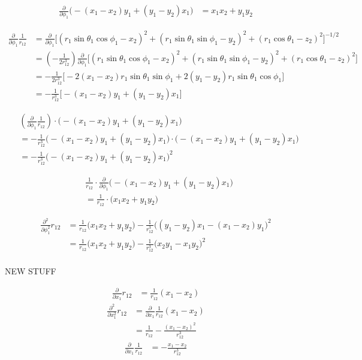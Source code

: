 \begin{align*}
    \frac{\partial}{\partial \phi_1} \Big( -(x_1-x_2)y_1 + (y_1-y_2)x_1 \Big)
    &= x_1x_2 + y_1y_2
\end{align*}

\begin{align*}
    \frac{\partial}{\partial \phi_1} \frac{1}{r_{12}}
    &= \frac{\partial}{\partial \phi_1} \Big[ (r_1\sin\theta_1\cos\phi_1 - x_2)^2 + (r_1\sin\theta_1\sin\phi_1 - y_2)^2 + (r_1\cos\theta_1 - z_2)^2 \Big]^{-1/2} \\
    &= \left(-\frac{1}{2r_{12}^3}\right) \frac{\partial}{\partial \phi_1} \Big[ (r_1\sin\theta_1\cos\phi_1 - x_2)^2 + (r_1\sin\theta_1\sin\phi_1 - y_2)^2 + (r_1\cos\theta_1 - z_2)^2 \Big] \\
    &= -\frac{1}{2r_{12}^3} \Big[ -2(x_1-x_2)r_1\sin\theta_1\sin\phi_1 + 2(y_1-y_2)r_1\sin\theta_1\cos\phi_1 \Big] \\
    &= -\frac{1}{r_{12}^3} \Big[ -(x_1-x_2)y_1 + (y_1-y_2)x_1 \Big]
\end{align*}

\begin{align*}
    &\left(\frac{\partial}{\partial \phi_1} \frac{1}{r_{12}} \right) \cdot \Big( -(x_1-x_2)y_1 + (y_1-y_2)x_1 \Big) \\
    &= -\frac{1}{r_{12}^3} \Big( -(x_1-x_2)y_1 + (y_1-y_2)x_1 \Big) \cdot \Big( -(x_1-x_2)y_1 + (y_1-y_2)x_1 \Big) \\
    &= -\frac{1}{r_{12}^3} \Big( -(x_1-x_2)y_1 + (y_1-y_2)x_1 \Big)^2
\end{align*}

\begin{align*}
    &\frac{1}{r_{12}} \cdot \frac{\partial}{\partial \phi_1} \Big( -(x_1-x_2)y_1 + (y_1-y_2)x_1 \Big) \\
    &= \frac{1}{r_{12}} \cdot \Big( x_1x_2 + y_1y_2 \Big)
\end{align*}

\begin{align*}
    \frac{\partial^2}{\partial \phi_1^2}r_{12}
    &= \frac{1}{r_{12}} \Big( x_1x_2 + y_1y_2 \Big) - \frac{1}{r_{12}^3} \Big( (y_1-y_2)x_1 - (x_1-x_2)y_1 \Big)^2 \\
    &= \frac{1}{r_{12}} \Big( x_1x_2 + y_1y_2 \Big) - \frac{1}{r_{12}^3} \Big( x_2y_1 - x_1y_2 \Big)^2 \\
\end{align*}

NEW STUFF

\begin{align*}
    \frac{\partial}{\partial x_1}r_{12}
    &= \frac{1}{r_{12}} (x_1 - x_2)
\end{align*}
\begin{align*}
    \frac{\partial^2}{\partial x_1^2}r_{12}
    &= \frac{\partial}{\partial x_1} \frac{1}{r_{12}} (x_1 - x_2) \\
    &= \frac{1}{r_{12}} - \frac{(x_1-x_2)^2}{r_{12}^3}
\end{align*}
\begin{align*}
    \frac{\partial}{\partial x_1} \frac{1}{r_{12}}
    &= -\frac{x_1-x_2}{r_{12}^3}
\end{align*}